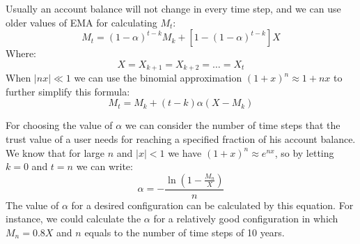 \documentclass{article}
\begin{document}
    Usually an account balance will not change in every time step, and we can use older values of EMA for calculating
    $M_{t}$:
    \[
        M_{t} = (1 - \alpha)^{t - k}M_{k} + [1 - (1 - \alpha)^{t - k}]X
    \]
    Where:
    \[
        X = X_{k+1} = X_{k+2} = \dots = X_t
    \]
    When $|nx| \ll 1$ we can use the binomial approximation  $(1 + x)^n \approx 1 + nx$ to further simplify this
    formula:
    \[
        M_{t} = M_{k} + (t - k) \alpha (X - M_{k})
    \]

    For choosing the value of $\alpha$ we can consider the number of time steps that the trust value of a user needs
    for reaching a specified fraction of his account balance.
    We know that for large $n$ and $|x| < 1$ we have $(1 + x)^{n} \approx e^{nx}$, so by letting $k = 0$ and $t = n$
    we can write:
    \[
        \alpha =- \frac{\ln\left(1 - \frac{M_{n}}{X}\right)}{n}
    \]
    The value of $\alpha$ for a desired configuration can be calculated by this equation.
    For instance, we could calculate the $\alpha$ for a relatively good configuration in which $M_{n} = 0.8X$ and $n$
    equals to the number of time steps of 10 years.
\end{document}
